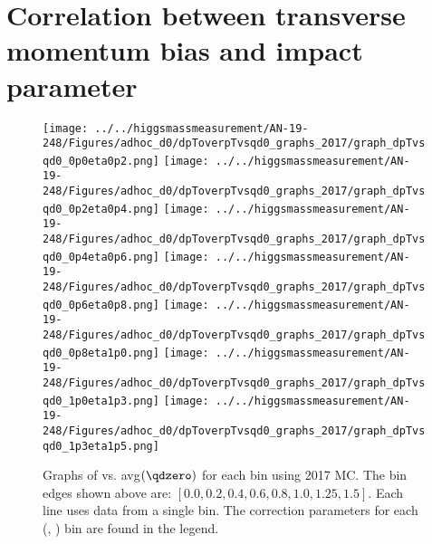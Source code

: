 \chapter{Correlation between transverse momentum bias and impact parameter}

\begin{figure}[!htbp]
    \centering
    { \texttt{[image: ../../higgsmassmeasurement/AN-19-248/Figures/adhoc\_d0/dpToverpTvsqd0\_graphs\_2017/graph\_dpTvsqd0\_0p0eta0p2.png]}}
    { \texttt{[image: ../../higgsmassmeasurement/AN-19-248/Figures/adhoc\_d0/dpToverpTvsqd0\_graphs\_2017/graph\_dpTvsqd0\_0p2eta0p4.png]}}
    { \texttt{[image: ../../higgsmassmeasurement/AN-19-248/Figures/adhoc\_d0/dpToverpTvsqd0\_graphs\_2017/graph\_dpTvsqd0\_0p4eta0p6.png]}}
    { \texttt{[image: ../../higgsmassmeasurement/AN-19-248/Figures/adhoc\_d0/dpToverpTvsqd0\_graphs\_2017/graph\_dpTvsqd0\_0p6eta0p8.png]}}
    { \texttt{[image: ../../higgsmassmeasurement/AN-19-248/Figures/adhoc\_d0/dpToverpTvsqd0\_graphs\_2017/graph\_dpTvsqd0\_0p8eta1p0.png]}}
    { \texttt{[image: ../../higgsmassmeasurement/AN-19-248/Figures/adhoc\_d0/dpToverpTvsqd0\_graphs\_2017/graph\_dpTvsqd0\_1p0eta1p3.png]}}
    { \texttt{[image: ../../higgsmassmeasurement/AN-19-248/Figures/adhoc\_d0/dpToverpTvsqd0\_graphs\_2017/graph\_dpTvsqd0\_1p3eta1p5.png]}}
    \caption{ 
        Graphs of \pTmismeas vs. avg$(\qdzero)$ for each \abseta bin using 2017 MC.
        The \abseta bin edges shown above are: $[0.0, 0.2, 0.4, 0.6, 0.8, 1.0, 1.25, 1.5]$.
        Each line uses data from a single \pT bin. 
        The \pT correction parameters for each (\abseta, \pT) bin are found in the legend.
    }
\end{figure}
\newpage
